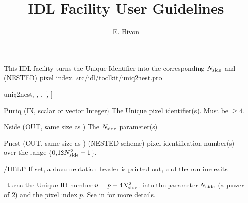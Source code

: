 
\sloppy


\title{\healpix IDL Facility User Guidelines}
 \section[uniq2nest]{ }
\label{idl:uniq2nest}
\author{E. Hivon}

\begin{facility}
{This IDL facility turns the Unique Identifier into the corresponding $N_{\rm side}$ and (NESTED) pixel index. 
}
{src/idl/toolkit/uniq2nest.pro}
\end{facility}

\begin{IDLformat}
{uniq2nest, 
, 
, 
 [,%
]}
\end{IDLformat}


\begin{qualifiers}
  \begin{qulist}{} %

\item[{Puniq}]  (IN, scalar or vector Integer) The \healpix Unique pixel identifier(s). Must be $\ge 4$.
\item[{Nside}]  (OUT, same size as ) The \healpix $N_{\rm side}$ parameter(s)
\item[{Pnest}]  (OUT, same size as ) (NESTED scheme) pixel identification number(s) over the range \{0,$12N_{\rm side}^2-1$\}.
  \end{qulist}
\end{qualifiers}

\begin{keywords}
  \begin{kwlist}{} %

\item[{/HELP}]  If set, a documentation header is printed out, and the routine exits
  \end{kwlist}
\end{keywords}


\begin{codedescription}
{\thedocid\ turns the Unique ID number $u = p + 4 N_{\rm side}^2$, into the parameter $N_{\rm side}$ (a power of 2) and the pixel index $p$. See  in 
 for more details.
}
\end{codedescription}


